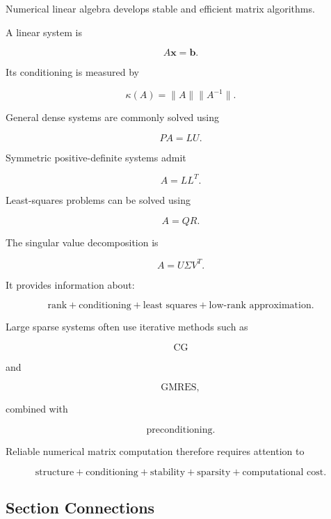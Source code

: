 Numerical linear algebra develops stable and efficient matrix algorithms.

A linear system is

\[
\boxed{
A\mathbf{x}
=
\mathbf{b}.
}
\]

Its conditioning is measured by

\[
\boxed{
\kappa(A)
=
\|A\|
\|A^{-1}\|.
}
\]

General dense systems are commonly solved using

\[
\boxed{
PA=LU.
}
\]

Symmetric positive-definite systems admit

\[
\boxed{
A=LL^T.
}
\]

Least-squares problems can be solved using

\[
\boxed{
A=QR.
}
\]

The singular value decomposition is

\[
\boxed{
A=U\Sigma V^T.
}
\]

It provides information about:

\[
\boxed{
\text{rank}
+
\text{conditioning}
+
\text{least squares}
+
\text{low-rank approximation}.
}
\]

Large sparse systems often use iterative methods such as

\[
\boxed{
\text{CG}
}
\]

and

\[
\boxed{
\text{GMRES},
}
\]

combined with

\[
\boxed{
\text{preconditioning}.
}
\]

Reliable numerical matrix computation therefore requires attention to

\[
\boxed{
\text{structure}
+
\text{conditioning}
+
\text{stability}
+
\text{sparsity}
+
\text{computational cost}.
}
\]

\subsection{Section Connections}
\label{subsec:nla-connections}


